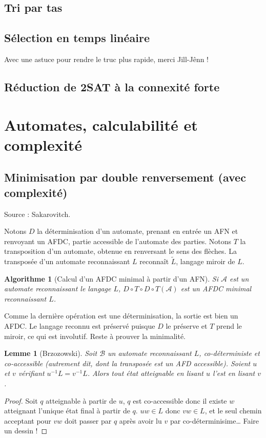 \documentclass[a4paper, 11pt]{article}
\newtheorem*{algo}{Algorithme}
\newtheorem*{lemma}{Lemme}
\begin{document}
\subsection{Tri par tas}

\subsection{Sélection en temps linéaire}

Avec une astuce pour rendre le truc plus rapide, merci Jill-Jênn !

\subsection{Réduction de 2SAT à la connexité forte}


\newpage

\section{Automates, calculabilité et complexité}

\subsection{Minimisation par double renversement (avec complexité)}

Source : Sakarovitch.

Notons $D$ la déterminisation d'un automate, prenant en entrée un AFN et
renvoyant un AFDC, partie accessible de l'automate des parties. Notons $T$ la
transposition d'un automate, obtenue en renversant le sens des flèches. La
transposée d'un automate reconnaissant $L$ reconnaît $\tilde{L}$, langage miroir
de $L$.

\begin{algo}[Calcul d'un AFDC minimal à partir d'un AFN]
  Si $\mathcal{A}$ est un automate reconnaissant le langage $L$, $D \circ T
  \circ D \circ T(\mathcal{A})$ est un AFDC minimal reconnaissant $L$.
\end{algo}

Comme la dernière opération est une déterminisation, la sortie est bien un AFDC.
Le langage reconnu est préservé puisque $D$ le préserve et $T$ prend le miroir,
ce qui est involutif. Reste à prouver la minimalité.

\begin{lemma}[Brzozowski]
  Soit $\mathcal{B}$ un automate reconnaissant $L$, \emph{co-déterministe} et
  \emph{co-accessible} (autrement dit, dont la transposée est un AFD
  accessible). Soient $u$ et $v$ vérifiant $u^{-1}L = v^{-1}L$. Alors tout état
  atteignable en lisant $u$ l'est en lisant $v$.
\end{lemma}
\begin{proof}
  Soit $q$ atteignable à partir de $u$, $q$ est co-accessible donc il existe $w$
  atteignant l'unique état final à partir de $q$. $uw \in L$ donc $vw \in L$, et
  le seul chemin acceptant pour $vw$ doit passer par $q$ après avoir lu $v$ par
  co-déterminisime… Faire un dessin !
\end{proof}
\end{document}
